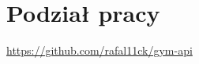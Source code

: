 \documentclass[../../spr.tex]{subfiles}
\begin{document}
\section{Podział pracy}
\url{https://github.com/rafal11ck/gym-api}
\end{document}
